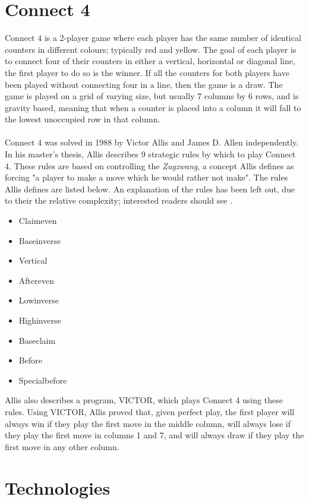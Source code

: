 \section{Connect 4}
Connect 4 is a 2-player game where each player has the same number of identical counters in different colours; typically red and yellow. The goal of each player is to connect four of their counters in either a vertical, horizontal or diagonal line, the first player to do so is the winner. If all the counters for both players have been played without connecting four in a line, then the game is a draw. The game is played on a grid of varying size, but usually 7 columns by 6 rows, and is gravity based, meaning that when a counter is placed into a column it will fall to the lowest unoccupied row in that column.
\\\\Connect 4 was solved in 1988 by Victor Allis and James D. Allen independently. In his master's thesis, Allis describes 9 strategic rules by which to play Connect 4. These rules are based on controlling the \emph{Zugzwang}, a concept Allis defines as forcing "a player to make a move which he would rather not make"\cite{connect4}. The rules Allis defines are listed below. An explanation of the rules has been left out, due to their the relative complexity; interested readers should see \cite{connect4}.
\begin{itemize}
  \item{Claimeven}
  \item{Baseinverse}
  \item{Vertical}
  \item{Aftereven}
  \item{Lowinverse}
  \item{Highinverse}
  \item{Baseclaim}
  \item{Before}
  \item{Specialbefore}
\end{itemize}
Allis also describes a program, VICTOR, which plays Connect 4 using these rules. Using VICTOR, Allis proved that, given perfect play, the first player will always win if they play the first move in the middle column, will always lose if they play the first move in columns 1 and 7, and will always draw if they play the first move in any other column\cite{connect4}.

\section{Technologies}

